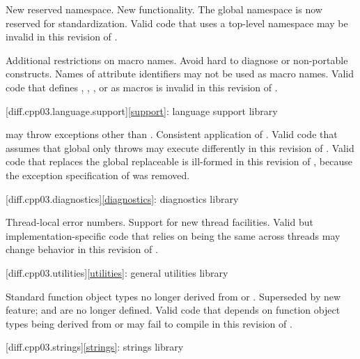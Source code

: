 \change
New reserved namespace.
\rationale
New functionality.
\effect
The global namespace  is now reserved for standardization. Valid
\CppIII{} code that uses a top-level namespace  may be invalid in
this revision of \Cpp{}.

\change
Additional restrictions on macro names.
\rationale
Avoid hard to diagnose or non-portable constructs.
\effect
Names of attribute identifiers may not be used as macro names. Valid \CppIII{}
code that defines , ,
, or  as macros is invalid in this
revision of \Cpp{}.

[diff.cpp03.language.support]{\ref{support}:
language support library}

\change
{} may throw exceptions other than
.
\rationale
Consistent application of .
\effect
Valid \CppIII{} code that assumes that global  only
throws  may execute differently in this revision of \Cpp{}.
Valid \CppIII{} code that replaces the global replaceable 
is ill-formed in this revision of \Cpp{},
because the exception specification of 
was removed.

[diff.cpp03.diagnostics]{\ref{diagnostics}: diagnostics library}

\change
Thread-local error numbers.
\rationale
Support for new thread facilities.
\effect
Valid but implementation-specific \CppIII{} code that relies on
 being the same across threads may change behavior in this
revision of \Cpp{}.

[diff.cpp03.utilities]{\ref{utilities}: general utilities library}

\change
Standard function object types no longer derived from
 or .
\rationale
Superseded by new feature;  and
 are no longer defined.
\effect
Valid \CppIII{} code that depends on function object types being derived from
 or  may fail to compile
in this revision of \Cpp{}.

[diff.cpp03.strings]{\ref{strings}: strings library}

